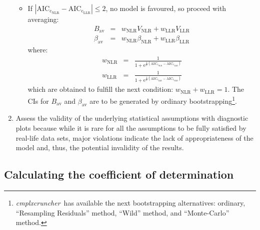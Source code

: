 \documentclass[12pt]{article}
\newcommand{\CC}[0]{\emph{cmplxcruncher}}
\begin{document}
\begin{enumerate}
\begin{itemize}
        \item If $\left|\mathrm{AIC_{c_{NLR}}} - \mathrm{AIC_{c_{LLR}}}\right| \leq 2$, no model is favoured, so proceed with averaging:
        \begin{eqnarray*}
            B_\text{av} &=& w_\text{NLR}V_\text{NLR} + w_\text{LLR}V_\text{LLR} \\
            \beta_\text{av} &=& w_\text{NLR}\beta_\text{NLR} + w_\text{LLR}\beta_\text{LLR}
        \end{eqnarray*}
        where: 
        \begin{eqnarray*}
            w_\text{NLR} &=& \frac{1}{1+\mathrm{e}^{\frac{1}{2}\left(\mathrm{AIC_{c_{NLR}}}-\mathrm{AIC_{c_{LLR}}}\right)}} \\
            w_\text{LLR} &=& \frac{1}{1+\mathrm{e}^{\frac{1}{2}\left(\mathrm{AIC_{c_{LLR}}}-\mathrm{AIC_{c_{NLR}}}\right)}}
        \end{eqnarray*}
        which are obtained to fulfill the next condition: $w_\text{NLR} + w_\text{LLR} = 1$. The CIs for $B_\text{av}$ and $\beta_\text{av}$ are to be generated by ordinary bootstrapping\footnote{\CC\ has available the next bootstrapping alternatives\cite{boot}: ordinary, ``Resampling Residuals'' method, ``Wild'' method, and ``Monte-Carlo'' method.}.      
    \end{itemize}
    \item Assess the validity of the underlying statistical assumptions with diagnostic plots because while it is rare for all the assumptions to be fully satisfied by real-life data sets, major violations indicate the lack of appropriateness of the model and, thus, the potential invalidity of the results.
\end{enumerate}

\subsection{Calculating the coefficient of determination}
\end{document}
